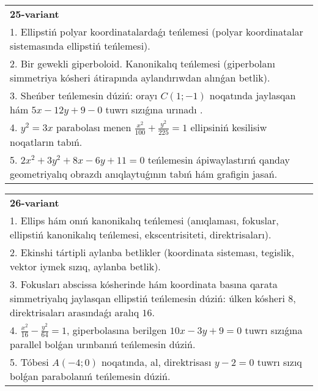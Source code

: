 \documentclass{article}
\begin{document}
\begin{tabular}{m{17cm}}
\textbf{25-variant}\\
1. Ellipstiń polyar koordinatalardaǵı teńlemesi (polyar koordinatalar sistemasında ellipstiń teńlemesi).\\

2. Bir gewekli giperboloid. Kanonikalıq teńlemesi (giperbolanı simmetriya kósheri átirapında aylandırıwdan alınǵan betlik).\\

3. Sheńber teńlemesin dúziń: orayı $C (1;-1) $ noqatında jaylasqan hám $5 x-12 y+9 -0$ tuwrı sızıǵına urınadı .\\

4. $y^{2} = 3x$ parabolası menen $\frac{x^{2}}{100} + \frac{y^{2}}{225} = 1$ ellipsiniń kesilisiw noqatların tabıń.  \\

5. $2x^{2} + 3y^{2} + 8x - 6y + 11 = 0$ teńlemesin ápiwaylastırıń qanday geometriyalıq obrazdı anıqlaytuǵının tabıń hám grafigin jasań.
\end{tabular}
\vspace{1cm}


\begin{tabular}{m{17cm}}
\textbf{26-variant}\\
1. Ellips hám onıń kanonikalıq teńlemesi (anıqlaması, fokuslar, ellipstiń kanonikalıq teńlemesi, ekscentrisiteti, direktrisaları).\\

2. Ekinshi tártipli aylanba betlikler (koordinata sisteması, tegislik, vektor iymek sızıq, aylanba betlik).\\

3. Fokusları abscissa kósherinde hám koordinata basına qarata simmetriyalıq jaylasqan ellipstiń teńlemesin dúziń: úlken kósheri $8$, direktrisaları arasındaǵı aralıq $16$.\\

4. $\frac{x^{2}}{16} - \frac{y^{2}}{64} = 1$, giperbolasına berilgen $10x - 3y + 9 = 0$ tuwrı sızıǵına parallel bolǵan urınbanıń teńlemesin dúziń.  \\

5. Tóbesi $A(-4;0)$ noqatında, al, direktrisası $y - 2 = 0$ tuwrı sızıq bolǵan parabolanıń teńlemesin dúziń.
\end{tabular}
\vspace{1cm}
\end{document}

